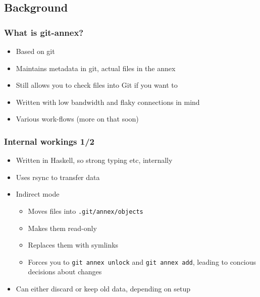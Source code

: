 \documentclass[t]{beamer}
\begin{document}
\subsection{Background}

\begin{frame}
	\frametitle{What is git-annex?}
	\begin{itemize}
		\item Based on git
		\item Maintains metadata in git, actual files in the annex
		\item Still allows you to check files into Git if you want to
		\item Written with low bandwidth and flaky connections in mind
		\item Various work-flows (more on that soon)
	\end{itemize}
\end{frame}

\begin{frame}
	\frametitle{Internal workings 1/2}
	\begin{itemize}
		\item Written in Haskell, so strong typing etc, internally
		\item Uses rsync to transfer data
		\item Indirect mode
		\begin{itemize}
			\item Moves files into \texttt{.git/annex/objects}
			\item Makes them read-only
			\item Replaces them with symlinks
			\item Forces you to \texttt{git annex unlock} and \texttt{git annex add}, leading to concious decisions about changes
		\end{itemize}
		\item Can either discard or keep old data, depending on setup
	\end{itemize}
\end{frame}
\end{document}
